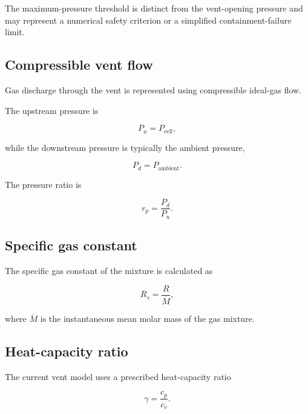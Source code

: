 The maximum-pressure threshold is distinct from the vent-opening
pressure and may represent a numerical safety criterion or a simplified
containment-failure limit.


\subsection{Compressible vent flow}

Gas discharge through the vent is represented using compressible
ideal-gas flow.

The upstream pressure is

\begin{equation}
    P_u
    =
    P_{\mathrm{cell}},
\end{equation}

while the downstream pressure is typically the ambient pressure,

\begin{equation}
    P_d
    =
    P_{\mathrm{ambient}}.
\end{equation}

The pressure ratio is

\begin{equation}
    r_p
    =
    \frac{
        P_d
    }{
        P_u
    }.
    \label{eq:pressure_ratio}
\end{equation}


\subsection{Specific gas constant}

The specific gas constant of the mixture is calculated as

\begin{equation}
    R_s
    =
    \frac{
        R
    }{
        \overline{M}
    },
    \label{eq:specific_gas_constant}
\end{equation}

where $\overline{M}$ is the instantaneous mean molar mass of the gas
mixture.


\subsection{Heat-capacity ratio}

The current vent model uses a prescribed heat-capacity ratio

\begin{equation}
    \gamma
    =
    \frac{
        c_p
    }{
        c_v
    }.
\end{equation}

